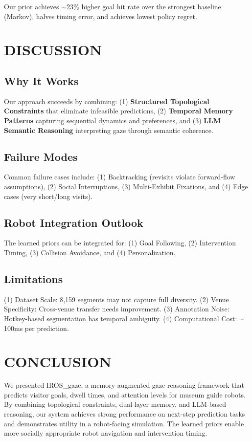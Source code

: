\documentclass[letterpaper]{article}
\begin{document}
Our prior achieves $\sim$23\% higher goal hit rate over the strongest baseline (Markov), halves timing error, and achieves lowest policy regret.

\section{DISCUSSION}

\subsection{Why It Works}

Our approach succeeds by combining: (1) \textbf{Structured Topological Constraints} that eliminate infeasible predictions, (2) \textbf{Temporal Memory Patterns} capturing sequential dynamics and preferences, and (3) \textbf{LLM Semantic Reasoning} interpreting gaze through semantic coherence.

\subsection{Failure Modes}

Common failure cases include: (1) Backtracking (revisits violate forward-flow assumptions), (2) Social Interruptions, (3) Multi-Exhibit Fixations, and (4) Edge cases (very short/long visits).

\subsection{Robot Integration Outlook}

The learned priors can be integrated for: (1) Goal Following, (2) Intervention Timing, (3) Collision Avoidance, and (4) Personalization.

\subsection{Limitations}

(1) Dataset Scale: 8,159 segments may not capture full diversity. (2) Venue Specificity: Cross-venue transfer needs improvement. (3) Annotation Noise: Hotkey-based segmentation has temporal ambiguity. (4) Computational Cost: $\sim$100ms per prediction.

\section{CONCLUSION}

We presented IROS\_gaze, a memory-augmented gaze reasoning framework that predicts visitor goals, dwell times, and attention levels for museum guide robots. By combining topological constraints, dual-layer memory, and LLM-based reasoning, our system achieves strong performance on next-step prediction tasks and demonstrates utility in a robot-facing simulation. The learned priors enable more socially appropriate robot navigation and intervention timing.
\end{document}
